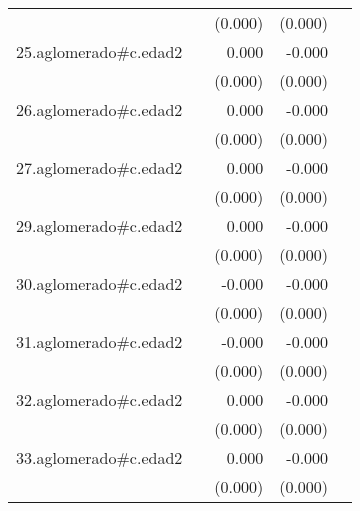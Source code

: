 {\begin{longtable}{l*{4}{D{.}{.}{-1}}}
            &                     &     (0.000)         &     (0.000)         &                     \\
\addlinespace
25.aglomerado#c.edad2&                     &       0.000         &      -0.000         &                     \\
            &                     &     (0.000)         &     (0.000)         &                     \\
\addlinespace
26.aglomerado#c.edad2&                     &       0.000         &      -0.000\sym{*}  &                     \\
            &                     &     (0.000)         &     (0.000)         &                     \\
\addlinespace
27.aglomerado#c.edad2&                     &       0.000         &      -0.000\sym{*}  &                     \\
            &                     &     (0.000)         &     (0.000)         &                     \\
\addlinespace
29.aglomerado#c.edad2&                     &       0.000         &      -0.000\sym{**} &                     \\
            &                     &     (0.000)         &     (0.000)         &                     \\
\addlinespace
30.aglomerado#c.edad2&                     &      -0.000         &      -0.000\sym{***}&                     \\
            &                     &     (0.000)         &     (0.000)         &                     \\
\addlinespace
31.aglomerado#c.edad2&                     &      -0.000         &      -0.000\sym{***}&                     \\
            &                     &     (0.000)         &     (0.000)         &                     \\
\addlinespace
32.aglomerado#c.edad2&                     &       0.000         &      -0.000\sym{**} &                     \\
            &                     &     (0.000)         &     (0.000)         &                     \\
\addlinespace
33.aglomerado#c.edad2&                     &       0.000         &      -0.000\sym{***}&                     \\
            &                     &     (0.000)         &     (0.000)         &                     \\

\end{longtable}}
